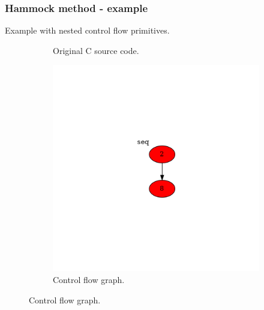 \documentclass[aspectratio=1610]{beamer}
\begin{document}
\begin{frame}[noframenumbering]
	\frametitle{Hammock method - example}
	Example with nested control flow primitives.
	\begin{figure}[htbp]
		\centering
		\begin{subfigure}[b]{0.30\textwidth}
			\centering
			
			\caption{Original C source code.}
		\end{subfigure}
		\begin{subfigure}[b]{0.50\textwidth}
			\centering
			\includegraphics[height=0.6\paperheight]{inc/methods/hammock/example/without-break/main_0004a.png}
			\caption{Control flow graph.}
		\end{subfigure}
	\end{figure}
\end{frame}
\end{document}
